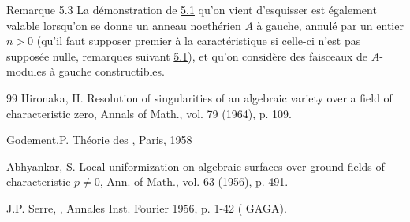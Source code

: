 \documentclass[10pt]{../fichiers-configuration-latex/smfart}
\begin{document}
\begin{enonce*}[remark]{Remarque 5.3}
La démonstration de \hyperref[XVI.thm5.1]{5.1} qu'on vient d'esquisser est également valable
lorsqu'on se donne un anneau noethérien $A$ à gauche, annulé par un
entier $n>0$ (qu'il faut supposer premier à la caractéristique si
celle-ci n'est pas supposée nulle, \cf remarques suivant \hyperref[XVI.thm5.1]{5.1}), et
qu'on considère des faisceaux de $A$-modules à gauche constructibles.
\end{enonce*}

\begin{thebibliography}{99}
 Hironaka, H. Resolution of singularities of an
algebraic variety over a field of characteristic zero, Annals of
Math., vol. 79 (1964), p. 109.

 Godement,\pageoriginale P. Théorie des
, Paris, 1958

 Abhyankar, S. Local uniformization on algebraic
surfaces over ground fields of characteristic $p\neq 0$, Ann. of
Math., vol. 63 (1956), p. 491.

 J.P. Serre, ,
Annales Inst. Fourier 1956, p. 1-42 ( GAGA).
\end{thebibliography}


\ifx\danslelivre\undefined
\end{document}
